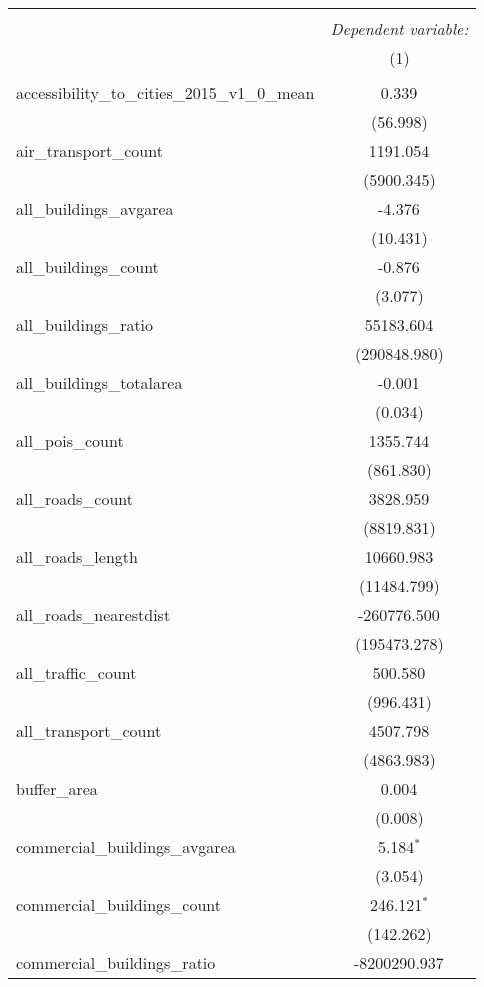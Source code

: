 \begin{table}[!htbp] \centering
\begin{tabular}{@{\extracolsep{5pt}}lc}
\\[-1.8ex]\hline
\hline \\[-1.8ex]
& \multicolumn{1}{c}{\textit{Dependent variable:}} \
\cr \cline{1-2}
\\[-1.8ex] & (1) \\
\hline \\[-1.8ex]
 accessibility_to_cities_2015_v1_0_mean & 0.339$^{}$ \\
  & (56.998) \\
 air_transport_count & 1191.054$^{}$ \\
  & (5900.345) \\
 all_buildings_avgarea & -4.376$^{}$ \\
  & (10.431) \\
 all_buildings_count & -0.876$^{}$ \\
  & (3.077) \\
 all_buildings_ratio & 55183.604$^{}$ \\
  & (290848.980) \\
 all_buildings_totalarea & -0.001$^{}$ \\
  & (0.034) \\
 all_pois_count & 1355.744$^{}$ \\
  & (861.830) \\
 all_roads_count & 3828.959$^{}$ \\
  & (8819.831) \\
 all_roads_length & 10660.983$^{}$ \\
  & (11484.799) \\
 all_roads_nearestdist & -260776.500$^{}$ \\
  & (195473.278) \\
 all_traffic_count & 500.580$^{}$ \\
  & (996.431) \\
 all_transport_count & 4507.798$^{}$ \\
  & (4863.983) \\
 buffer_area & 0.004$^{}$ \\
  & (0.008) \\
 commercial_buildings_avgarea & 5.184$^{*}$ \\
  & (3.054) \\
 commercial_buildings_count & 246.121$^{*}$ \\
  & (142.262) \\
 commercial_buildings_ratio & -8200290.937$^{}$ \\

\end{tabular}
\end{table}
